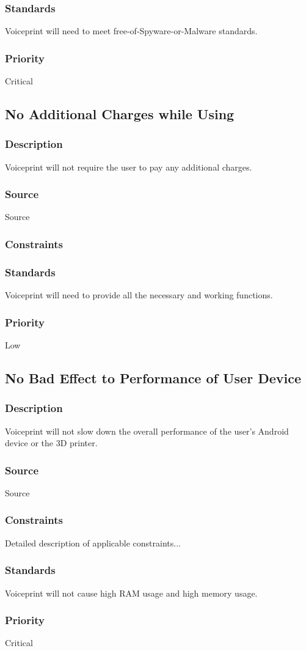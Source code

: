\subsubsection{Standards}
Voiceprint will need to meet free-of-Spyware-or-Malware standards.
\subsubsection{Priority}
Critical

\subsection{No Additional Charges while Using}
\subsubsection{Description}
Voiceprint will not require the user to pay any additional charges.
\subsubsection{Source}
Source
\subsubsection{Constraints}

\subsubsection{Standards}
Voiceprint will need to provide all the necessary and working functions.
\subsubsection{Priority}
Low

\subsection{No Bad Effect to Performance of User Device}
\subsubsection{Description}
Voiceprint will not slow down the overall performance of the user's Android device or the 3D printer.
\subsubsection{Source}
Source
\subsubsection{Constraints}
Detailed description of applicable constraints...
\subsubsection{Standards}
Voiceprint will not cause high RAM usage and high memory usage.
\subsubsection{Priority}
Critical